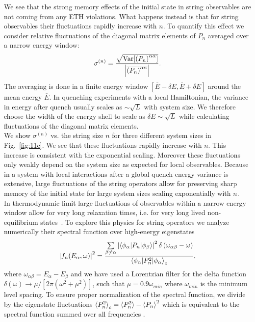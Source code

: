 \documentclass[aps,prx,twocolumn]{revtex4-2}
\begin{document}
{We see that the strong memory effects of the initial state in string observables are not coming from any ETH violations.  What happens instead is that for string observables their fluctuations  rapidly increase with $n$.  To quantify this effect we consider relative fluctuations of the diagonal matrix elements of $P_n$ averaged over a narrow energy window:
\begin{equation}
	\sigma^{(n)}=\frac{\sqrt{{\rm Var}[\left(P_n\right)^{\alpha\alpha}]}}{\left|\overline{\left(P_n\right)^{\alpha\alpha}}\right|}.
\end{equation}
The averaging is done in a finite energy window $\left[\overline{E}-\delta E,\overline{E}+\delta E\right]$ around the mean energy $\overline{E}$. In quenching experiments with a local Hamiltonian, the variance in energy after quench usually scales as $\sim\sqrt{L}$ with system size. We therefore choose the width of the energy shell to scale as $\delta E\sim\sqrt{L}$ while calculating fluctuations of the diagonal matrix elements.\\



We show $\sigma^{(n)}$ vs. the string size $n$ for three different system sizes in Fig.~\ref{fig:11c}.  We see that these fluctuations rapidly increase with $n$.  This increase is consistent with the exponential scaling. Moreover these fluctuations only weakly depend on the system size as expected for local observables.  Because in a system with local interactions after a global quench energy variance is extensive,  large fluctuations of the string operators allow for preserving sharp memory of the initial state  { for large system sizes scaling exponentially with $n$}.\\

 {In thermodynamic limit large fluctuations of observables within a narrow energy window allow for very long relaxation times,  i.e.  for very long lived non-equilibrium states~\cite{Dymarsky_2019}.}  To explore this physics for string operators we analyze numerically their spectral function over high-energy eigenstates
\begin{equation}\label{eq:spect}
	\left|f_n(E_{\alpha},\omega)\right|^2=\frac{\sum\limits_{\beta\neq \alpha}\left|\braket{\phi_{\alpha}|P_n|\phi_{\beta}}\right|^2\delta\left(\omega_{\alpha\beta}-\omega\right)}{\braket{\phi_{\alpha}|P_n^2|\phi_{\alpha}}_c},
\end{equation}
where $\omega_{\alpha\beta}=E_{\alpha}-E_{\beta}$ and we have used a Lorentzian filter for the delta function  $\delta(\omega)\rightarrow\mu/[2\pi(\omega^2+\mu^2)]$, such that $\mu=0.9\omega_{min}$ where $\omega_{min}$ is the minimum level spacing. To ensure proper normalization of the spectral function, we divide by the eigenstate fluctuations $\braket{P_n^2}_c=\braket{P_n^2}-\braket{P_n}^2$ which is equivalent to the spectral function summed over all frequencies \cite{dries21}. \\
\begin{figure*}
	\hspace{1cm}
	

\end{figure*}}
\end{document}
